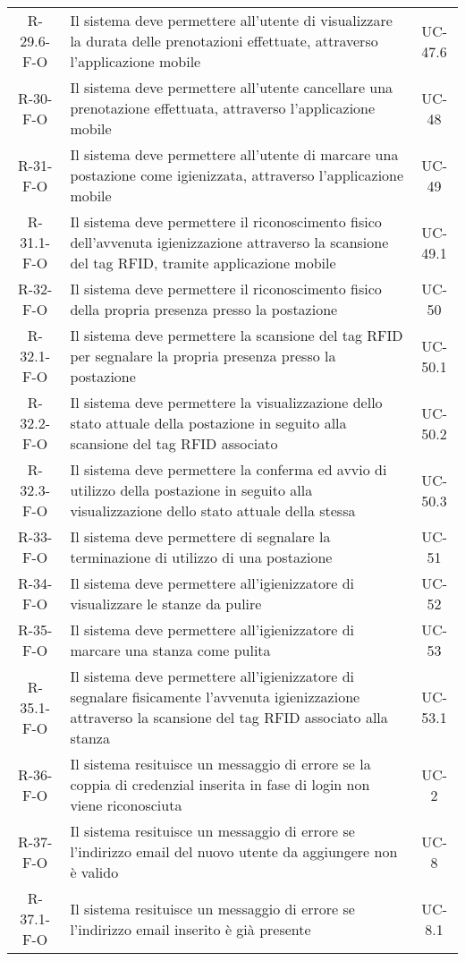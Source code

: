 \begin{longtable}{ c C{9.5cm} c }
    R-29.6-F-O & Il sistema deve permettere all'utente di visualizzare la durata delle prenotazioni effettuate, attraverso l'applicazione mobile& UC-47.6\\
    R-30-F-O & Il sistema deve permettere all'utente cancellare una prenotazione effettuata, attraverso l'applicazione mobile& UC-48\\
    R-31-F-O & Il sistema deve permettere all'utente di marcare una postazione come igienizzata, attraverso l'applicazione mobile& UC-49\\
    R-31.1-F-O & Il sistema deve permettere il riconoscimento fisico dell'avvenuta igienizzazione attraverso la scansione del tag RFID, tramite applicazione mobile& UC-49.1\\
    R-32-F-O & Il sistema deve permettere il riconoscimento fisico della propria presenza presso la postazione& UC-50\\
    R-32.1-F-O & Il sistema deve permettere la scansione del tag RFID per segnalare la propria presenza presso la postazione& UC-50.1\\
    R-32.2-F-O & Il sistema deve permettere la visualizzazione dello stato attuale della postazione in seguito alla scansione del tag RFID associato& UC-50.2\\
    R-32.3-F-O & Il sistema deve permettere la conferma ed avvio di utilizzo della postazione in seguito alla visualizzazione dello stato attuale della stessa& UC-50.3\\
    R-33-F-O & Il sistema deve permettere di segnalare la terminazione di utilizzo di una postazione& UC-51\\
    R-34-F-O & Il sistema deve permettere all'igienizzatore di visualizzare le stanze da pulire& UC-52\\
    R-35-F-O & Il sistema deve permettere all'igienizzatore di marcare una stanza come pulita& UC-53\\
    R-35.1-F-O & Il sistema deve permettere all'igienizzatore di segnalare fisicamente l'avvenuta igienizzazione attraverso la scansione del tag RFID associato alla stanza& UC-53.1\\
    R-36-F-O & Il sistema resituisce un messaggio di errore se la coppia di credenzial inserita in fase di  login non viene riconosciuta& UC-2\\
    R-37-F-O & Il sistema resituisce un messaggio di errore se l'indirizzo email del nuovo utente da aggiungere non è valido& UC-8\\
    R-37.1-F-O & Il sistema resituisce un messaggio di errore se l'indirizzo email inserito è già presente& UC-8.1\\

\end{longtable}
